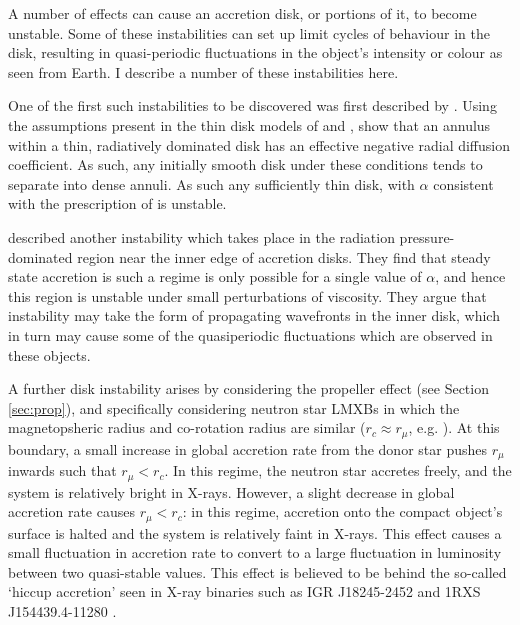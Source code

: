 \par A number of effects can cause an accretion disk, or portions of it, to become unstable.  Some of these instabilities can set up limit cycles of behaviour in the disk, resulting in quasi-periodic fluctuations in the object's intensity or colour as seen from Earth.  I describe a number of these instabilities here.
\par One of the first such instabilities to be discovered was first described by \citealp{Lightman_Instability}.  Using the assumptions present in the thin disk models of \citet{Shakura_Disk} and \citet{Novikov_Torque}, \citeauthor{Lightman_Instability} show that an annulus within a thin, radiatively dominated disk has an effective negative radial diffusion coefficient.  As such, any initially smooth disk under these conditions tends to separate into dense annuli.  As such any sufficiently thin disk, with $\alpha$ consistent with the prescription of \citet{Shakura_Disk} is unstable.
\par \citet{Shakura_Instab} described another instability which takes place in the radiation pressure-dominated region near the inner edge of accretion disks.  They find that steady state accretion is such a regime is only possible for a single value of $\alpha$, and hence this region is unstable under small perturbations of viscosity.  They argue that instability may take the form of propagating wavefronts in the inner disk, which in turn may cause some of the quasiperiodic fluctuations which are observed in these objects.

\label{sec:hic}

\par A further disk instability arises by considering the propeller effect (see Section \ref{sec:prop}), and specifically considering neutron star LMXBs in which the magnetopsheric radius and co-rotation radius are similar ($r_c\approx r_\mu$, e.g. \citealp{Spruit_Type2Mod}).  At this boundary, a small increase in global accretion rate from the donor star pushes $r_\mu$ inwards such that $r_\mu<r_c$.  In this regime, the neutron star accretes freely, and the system is relatively bright in X-rays.  However, a slight decrease in global accretion rate causes $r_\mu<r_c$: in this regime, accretion onto the compact object's surface is halted and the system is relatively faint in X-rays.  This effect causes a small fluctuation in accretion rate to convert to a large fluctuation in luminosity between two quasi-stable values.  This effect is believed to be behind the so-called `hiccup accretion' seen in X-ray binaries such as IGR J18245-2452 \citep{Ferrigno_TMSPVar} and 1RXS J154439.4-11280 \citep{Bogdanov_Proxy}.

